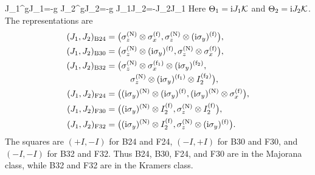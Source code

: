 {J_1^\trans gJ_1=-g}
{J_2^\trans gJ_2=-g}
{J_1J_2=-J_2J_1}
Here \(\Theta_1=\mathrm{i} J_1\mathcal{K}\) and \(\Theta_2=\mathrm{i} J_2\mathcal{K}\).  The
representations are
\begin{align*}
(J_1,J_2)_{\rm B24}={}&
 \bigl(\sigma_z^{({\rm N})}\otimes\sigma_x^{({\rm f})},
 \sigma_z^{({\rm N})}\otimes(\mathrm{i}\sigma_y)^{({\rm f})}\bigr),\\
(J_1,J_2)_{\rm B30}={}&
 \bigl(\sigma_z^{({\rm N})}\otimes(\mathrm{i}\sigma_y)^{({\rm f})},
 \sigma_z^{({\rm N})}\otimes\sigma_x^{({\rm f})}\bigr),\\
(J_1,J_2)_{\rm B32}={}&
 \bigl(\sigma_z^{({\rm N})}\otimes\sigma_x^{({\rm f}_1)}
       \otimes(\mathrm{i}\sigma_y)^{({\rm f}_2)},\notag\\[-2pt]
&\hspace{1.5em}
 \sigma_z^{({\rm N})}\otimes(\mathrm{i}\sigma_y)^{({\rm f}_1)}
       \otimes I_2^{({\rm f}_2)}\bigr),\\
(J_1,J_2)_{\rm F24}={}&
 \bigl((\mathrm{i}\sigma_y)^{({\rm N})}\otimes(\mathrm{i}\sigma_y)^{({\rm f})},
 (\mathrm{i}\sigma_y)^{({\rm N})}\otimes\sigma_x^{({\rm f})}\bigr),\\
(J_1,J_2)_{\rm F30}={}&
 \bigl((\mathrm{i}\sigma_y)^{({\rm N})}\otimes I_2^{({\rm f})},
 \sigma_z^{({\rm N})}\otimes I_2^{({\rm f})}\bigr),\\
(J_1,J_2)_{\rm F32}={}&
 \bigl((\mathrm{i}\sigma_y)^{({\rm N})}\otimes I_2^{({\rm f})},
 \sigma_z^{({\rm N})}\otimes(\mathrm{i}\sigma_y)^{({\rm f})}\bigr).
\end{align*}
The squares are \((+I,-I)\) for B24 and F24, \((-I,+I)\) for
B30 and F30, and \((-I,-I)\) for B32 and F32.  Thus B24, B30, F24,
and F30 are in the Majorana class, while B32 and F32 are in the Kramers
class.
